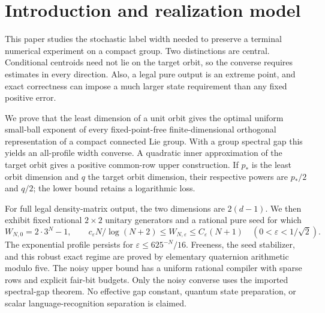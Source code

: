 \section{Introduction and realization model}
This paper studies the stochastic label width needed to preserve a
terminal numerical experiment on a compact group. Two distinctions are
central. Conditional centroids need not lie on the target orbit, so the
converse requires estimates in every direction. Also, a legal pure output
is an extreme point, and exact correctness can impose a much larger
state requirement than any fixed positive error.

We prove that the least dimension of a unit orbit gives the optimal
uniform small-ball exponent of every fixed-point-free finite-dimensional
orthogonal representation of a compact connected Lie group. With a group
spectral gap this yields an all-profile width converse. A quadratic inner
approximation of the target orbit gives a positive common-row upper
construction. If $p_*$ is the least orbit dimension and $q$ the target
orbit dimension, their respective powers are $p_*/2$ and $q/2$; the
lower bound retains a logarithmic loss.

For full legal density-matrix output, the two dimensions are
$2(d-1)$. We then exhibit fixed rational $2\times2$ unitary generators
and a rational pure seed for which
\[
 W_{N,0}=2\cdot3^N-1,
 \qquad
 c_\varepsilon N/\log(N+2)\le W_{N,\varepsilon}
                          \le C_\varepsilon(N+1)
 \quad(0<\varepsilon<1/\sqrt2).
\]
The exponential profile persists for
$\varepsilon\le625^{-N}/16$. Freeness, the seed stabilizer, and this
robust exact regime are proved by elementary quaternion arithmetic
modulo five. The noisy upper bound has a uniform rational compiler with
sparse rows and explicit fair-bit budgets. Only the noisy converse uses
the imported spectral-gap theorem. No effective gap constant, quantum
state preparation, or scalar language-recognition separation is claimed.

